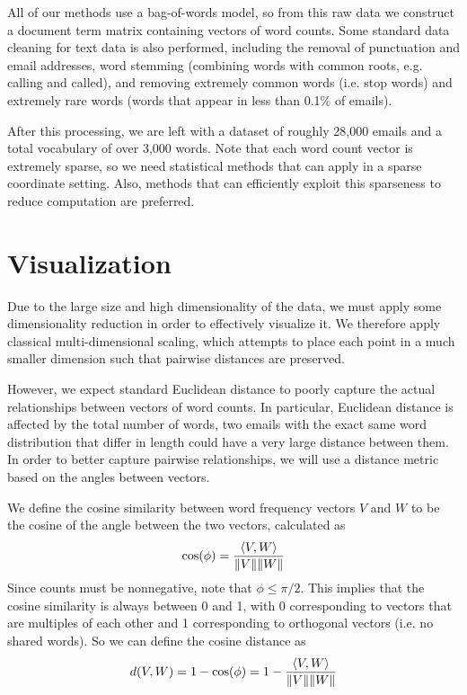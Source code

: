 \documentclass[12pt]{article}
\DeclarePairedDelimiter{\norm}{\lVert}{\rVert}
\theoremstyle{definition}
\theoremstyle{algodesc}
\begin{document}
All of our methods use a bag-of-words model, so from this raw data we construct a document term matrix containing vectors of word counts. Some standard data cleaning for text data is also performed, including the removal of punctuation and email addresses, word stemming (combining words with common roots, e.g. calling and called), and removing extremely common words (i.e. stop words) and extremely rare words (words that appear in less than 0.1\% of emails).

After this processing, we are left with a dataset of roughly 28,000 emails and a total vocabulary of over 3,000 words. Note that each word count vector is extremely sparse, so we need statistical methods that can apply in a sparse coordinate setting. Also, methods that can efficiently exploit this sparseness to reduce computation are preferred.


\section{Visualization}
Due to the large size and high dimensionality of the data, we must apply some dimensionality reduction in order to effectively visualize it. We therefore apply classical multi-dimensional scaling, which attempts to place each point in a much smaller dimension such that pairwise distances are preserved.

However, we expect standard Euclidean distance to poorly capture the actual relationships between vectors of word counts. In particular, Euclidean distance is affected by the total number of words, two emails with the exact same word distribution that differ in length could have a very large distance between them. In order to better capture pairwise relationships, we will use a distance metric based on the angles between vectors.

We define the cosine similarity between word frequency vectors $V$ and $W$ to be the cosine of the angle between the two vectors, calculated as
\begin{equation} \label{eq:cos_sim}
\cos(\phi) = \frac{\langle V, W \rangle}{\norm{V}\norm{W}}
\end{equation}
Since counts must be nonnegative, note that $\phi \leq \pi/2$. This implies that the cosine similarity is always between 0 and 1, with 0 corresponding to vectors that are multiples of each other and 1 corresponding to orthogonal vectors (i.e. no shared words). So we can define the cosine distance as
\begin{equation} \label{eq:cos_dist}
d(V, W) = 1 - \cos(\phi) = 1 - \frac{\langle V, W \rangle}{\norm{V}\norm{W}}
\end{equation}
\end{document}
